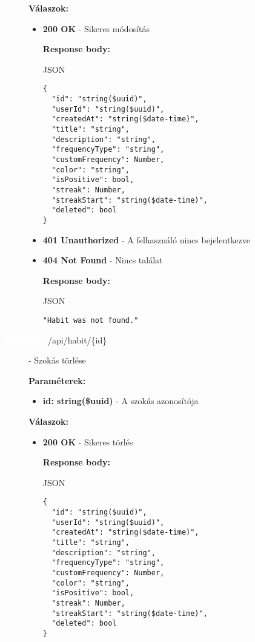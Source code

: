 \documentclass[12pt]{report}
\newcommand{\httpDelete}[1]{\colorbox{deleteColor}{\textbf{\textcolor{white}{DELETE}}}~#1}
\begin{document}
\begin{description}
    \vspace{0.5cm}
    \textbf{Válaszok:}
    \begin{itemize}
      \item \textbf{200 OK} - Sikeres módosítás

        \textbf{Response body:}
        \begin{codeblock}{JSON}
          \begin{verbatim}
{
  "id": "string($uuid)",
  "userId": "string($uuid)",
  "createdAt": "string($date-time)",
  "title": "string",
  "description": "string",
  "frequencyType": "string",
  "customFrequency": Number,
  "color": "string",
  "isPositive": bool,
  "streak": Number,
  "streakStart": "string($date-time)",
  "deleted": bool
}
          \end{verbatim}
        \end{codeblock}
    
      \item \textbf{401 Unauthorized} - A felhasználó nincs bejelentkezve

      \item \textbf{404 Not Found} - Nincs találat

        \textbf{Response body:}
        \begin{codeblock}{JSON}
          \begin{verbatim}
"Habit was not found."
          \end{verbatim}
        \end{codeblock}
    \end{itemize}

  \item[\httpDelete{/api/habit/\{id\}}] - Szokás törlése
  
    \vspace{0.5cm}
    \textbf{Paraméterek:}
    \begin{itemize}
      \item \textbf{id: string(\$uuid)} - A szokás azonosítója
    \end{itemize}

    \vspace{0.5cm}
    \textbf{Válaszok:}
    \begin{itemize}
      \item \textbf{200 OK} - Sikeres törlés

        \textbf{Response body:}
        \begin{codeblock}{JSON}
          \begin{verbatim}
{
  "id": "string($uuid)",
  "userId": "string($uuid)",
  "createdAt": "string($date-time)",
  "title": "string",
  "description": "string",
  "frequencyType": "string",
  "customFrequency": Number,
  "color": "string",
  "isPositive": bool,
  "streak": Number,
  "streakStart": "string($date-time)",
  "deleted": bool
}
          \end{verbatim}
        \end{codeblock}


\end{itemize}
\end{description}
\end{document}
